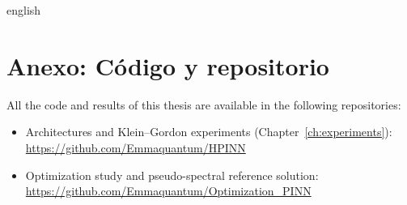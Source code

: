 
\begin{hyphenrules}{english}

\chapter{Anexo: Código y repositorio}
All the code and results of this thesis are available in the following repositories:
\begin{itemize}
  \item Architectures and Klein--Gordon experiments (Chapter~\ref{ch:experiments}):
    \url{https://github.com/Emmaquantum/HPINN}
  \item Optimization study and pseudo-spectral reference solution:
    \url{https://github.com/Emmaquantum/Optimization_PINN}
\end{itemize}

\end{hyphenrules}
